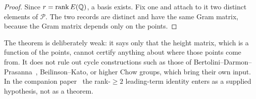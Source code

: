 \begin{proof}
Since $r=\operatorname{rank} E(\mathbb{Q})$, a basis exists.  Fix one and attach to it two
distinct elements of $\mathcal P$.  The two records are distinct and have
the same Gram matrix, because the Gram matrix depends only on the
points.
\end{proof}

The theorem is deliberately weak: it says only that the height matrix,
which is a function of the points, cannot certify anything about where
those points come from.  It does not rule out cycle constructions such as
those of Bertolini--Darmon--Prasanna~\citep{BertoliniDarmonPrasanna2013},
Beilinson--Kato, or higher Chow groups, which bring their own input.  In
the companion paper~\citep{TsiokosBSDClosure2026} the rank-$\ge2$
leading-term identity enters as a supplied hypothesis, not as a theorem.
